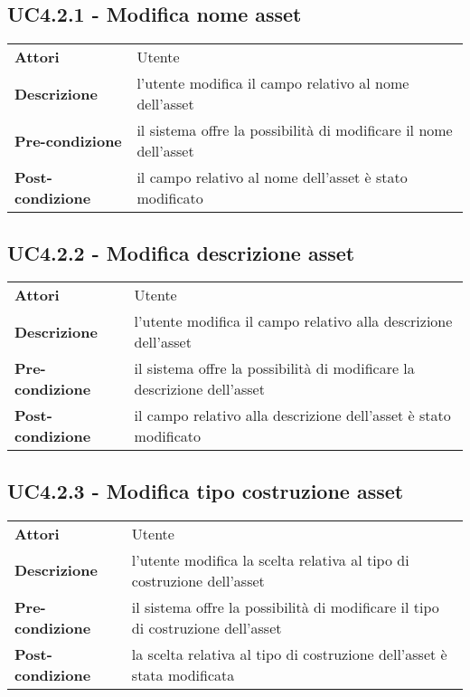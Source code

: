 \subsection{UC4.2.1 - Modifica nome asset}
\label{sssec:UC4.2.1}
\def\arraystretch{1.5}
\begin{tabularx}{\textwidth}{l|p{}}
\rowcolor{I} \multicolumn{2}{c}{\color{white}\textbf{UC4.2.1 - Modifica nome asset}} \\
\toprule
\endhead
\textbf{Attori} & Utente\\
\textbf{Descrizione} & l'utente modifica il campo relativo al nome dell'asset\\
\textbf{Pre-condizione} & il sistema offre la possibilità di modificare il nome dell'asset\\
\textbf{Post-condizione} & il campo relativo al nome dell'asset è stato modificato\\
\bottomrule
\end{tabularx}
\subsection{UC4.2.2 - Modifica descrizione asset}
\label{sssec:UC4.2.2}
\def\arraystretch{1.5}
\begin{tabularx}{\textwidth}{l|p{}}
\rowcolor{I} \multicolumn{2}{c}{\color{white}\textbf{UC4.2.2 - Modifica descrizione asset}} \\
\toprule
\endhead
\textbf{Attori} & Utente\\
\textbf{Descrizione} & l'utente modifica il campo relativo alla descrizione dell'asset\\
\textbf{Pre-condizione} & il sistema offre la possibilità di modificare la descrizione dell'asset\\
\textbf{Post-condizione} & il campo relativo alla descrizione dell'asset è stato modificato\\
\bottomrule
\end{tabularx}
\subsection{UC4.2.3 - Modifica tipo costruzione asset}
\label{sssec:UC4.2.3}
\def\arraystretch{1.5}
\begin{tabularx}{\textwidth}{l|p{}}
\rowcolor{I} \multicolumn{2}{c}{\color{white}\textbf{UC4.2.3 - Modifica tipo costruzione asset}} \\
\toprule
\endhead
\textbf{Attori} & Utente\\
\textbf{Descrizione} & l'utente modifica la scelta relativa al tipo di costruzione dell'asset\\
\textbf{Pre-condizione} & il sistema offre la possibilità di modificare il tipo di costruzione dell'asset\\
\textbf{Post-condizione} & la scelta relativa al tipo di costruzione dell'asset è stata modificata\\
\bottomrule
\end{tabularx}
